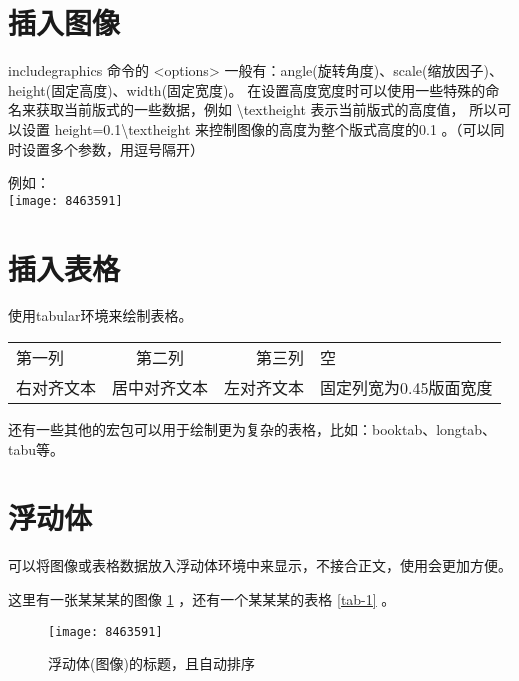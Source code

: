 \documentclass[UTF8]{ctexart}   %
\begin{document}
    \section{插入图像}

    includegraphics 命令的 <options> 一般有：angle(旋转角度)、scale(缩放因子)、height(固定高度)、width(固定宽度)。
    在设置高度宽度时可以使用一些特殊的命名来获取当前版式的一些数据，例如 \textbackslash textheight 表示当前版式的高度值，
    所以可以设置 height=0.1\textbackslash textheight 来控制图像的高度为整个版式高度的0.1 。（可以同时设置多个参数，用逗号隔开）

    例如：\\
    \texttt{[image: 8463591]}

    \section{插入表格}

    使用tabular环境来绘制表格。

    \begin{tabular}{l c | r|p{}|}     
        \hline      %
        第一列 & 第二列 & 第三列 & 空 \\
        右对齐文本 & 居中对齐文本 & 左对齐文本 & 固定列宽为0.45版面宽度 \\
        \hline
    \end{tabular}

    还有一些其他的宏包可以用于绘制更为复杂的表格，比如：booktab、longtab、tabu等。

    \section{浮动体}

    可以将图像或表格数据放入浮动体环境中来显示，不接合正文，使用会更加方便。

    这里有一张某某某的图像 \ref{fig-1} ，还有一个某某某的表格 \ref{tab-1} 。

    \begin{figure}[h]   %
        \centering      %
        \texttt{[image: 8463591]}
        \caption{浮动体(图像)的标题，且自动排序}\label{fig-1}   %
    \end{figure}
\end{document}
